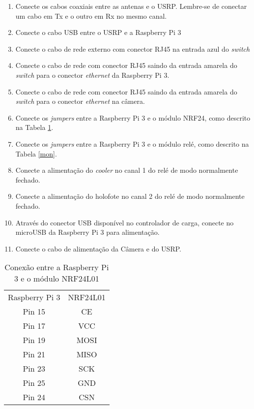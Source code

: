   \begin{enumerate} 
  \item Conecte os cabos coaxiais entre as antenas e o USRP. Lembre-se de conectar um cabo em Tx e o outro em Rx no mesmo canal.  
  \item  Conecte o cabo USB entre o USRP e a Raspberry Pi 3 
  \item Conecte o cabo de rede externo com conector RJ45 na entrada azul do \emph{switch}
  \item Conecte o cabo de rede com conector RJ45 saindo da entrada amarela do \emph{switch} para o conector \emph{ethernet} da Raspberry Pi 3. 
  \item Conecte o cabo de rede com conector RJ45 saindo da entrada amarela do \emph{switch} para o conector \emph{ethernet} na câmera.
  \item Conecte os \emph{jumpers} entre a Raspberry Pi 3 e o módulo NRF24, como descrito na Tabela \ref{nrf}.
  \item Conecte os \emph{jumpers} entre a Raspberry Pi 3 e o módulo relé, como descrito na Tabela \ref{mon}.
  \item Conecte a alimentação do \emph{cooler} no canal 1 do relé de modo normalmente fechado.
  \item Conecte a alimentação do holofote no canal 2 do relé de modo normalmente fechado. 
  \item Através do conector USB disponível no controlador de carga, conecte no microUSB da Raspberry Pi 3 para alimentação.  
  \item Conecte o cabo de alimentação da Câmera e do USRP.
  \end{enumerate}


\begin{table}[H]
\centering
\caption{Conexão entre a Raspberry Pi 3 e o módulo NRF24L01}
\begin{tabular}{cc}
Raspberry Pi 3 & NRF24L01 \\
Pin 15         & CE       \\
Pin 17         & VCC      \\
Pin 19         & MOSI     \\
Pin 21         & MISO     \\
Pin 23         & SCK      \\
Pin 25         & GND      \\
Pin 24         & CSN     
\end{tabular}
\label{nrf}
\end{table}

